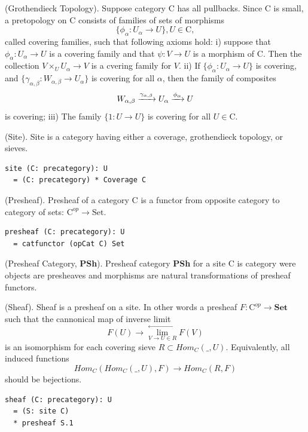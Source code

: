 \begin{definition}
\begin{definition} (Grothendieck Topology).
Suppose category $\mathrm{C}$ has all pullbacks.
Since $\mathrm{C}$ is small, a pretopology on $\mathrm{C}$ consists of families of sets of
morphisms
$$
    \{ \phi_\alpha : U_\alpha \rightarrow U \}, U \in \mathrm{C},
$$
called covering families, such that following axioms hold:
i) suppose that $\phi_\alpha : U_\alpha \rightarrow U$ is a covering family
and that $\psi : V \rightarrow U$ is a morphism of $\mathrm{C}$.
Then the collection $V \times_U U_\alpha \rightarrow V$ is a cvering family for $V$.
ii) If $\{\phi_\alpha : U_\alpha \rightarrow U \}$ is covering,
and $\{\gamma_{\alpha,\beta} : W_{\alpha,\beta} \rightarrow U_\alpha \}$
is covering for all $\alpha$, then the family of composites
$$
    W_{\alpha,\beta} \xrightarrow{{\gamma_{\alpha,\beta}}} U_\alpha \xrightarrow{{\phi_\alpha}} U
$$
is covering; iii) The family $\{1: U \rightarrow U\}$ is covering for all $U \in \mathrm{C}$.
\end{definition}

\begin{definition} (Site).
Site is a category having either a coverage, grothendieck topology, or sieves.
\begin{lstlisting}
site (C: precategory): U
  = (C: precategory) * Coverage C
\end{lstlisting}
\end{definition}

\begin{definition} (Presheaf).
Presheaf of a category $\mathrm{C}$ is a functor from opposite category to category of sets:
$\mathrm{C}^{op} \rightarrow \mathrm{Set}$.
\begin{lstlisting}
presheaf (C: precategory): U
  = catfunctor (opCat C) Set
\end{lstlisting}
\end{definition}

\begin{definition} (Presheaf Category, {\bf PSh}).
Presheaf category {\bf PSh} for a site $\mathrm{C}$ is category
were objects are presheaves and morphisms are natural transformations
of presheaf functors.
\end{definition}

\begin{definition} (Sheaf). Sheaf is a presheaf on a site. In other words
a presheaf $F : \mathrm{C}^{op} \rightarrow \mathbf{Set}$ such that the
cannonical map of inverse limit
$$
    F(U) \rightarrow \lim^{\leftarrow}_{V \to U \in R}{F(V)}
$$
is an isomorphism for each covering sieve $R \subset Hom_C(\_,U)$.
Equivalently, all induced functions
$$
    Hom_C(Hom_C(\_,U),F) \rightarrow Hom_C(R,F)
$$
should be bejections.
\begin{lstlisting}
sheaf (C: precategory): U
  = (S: site C)
  * presheaf S.1
\end{lstlisting}
\end{definition}


\end{definition}
